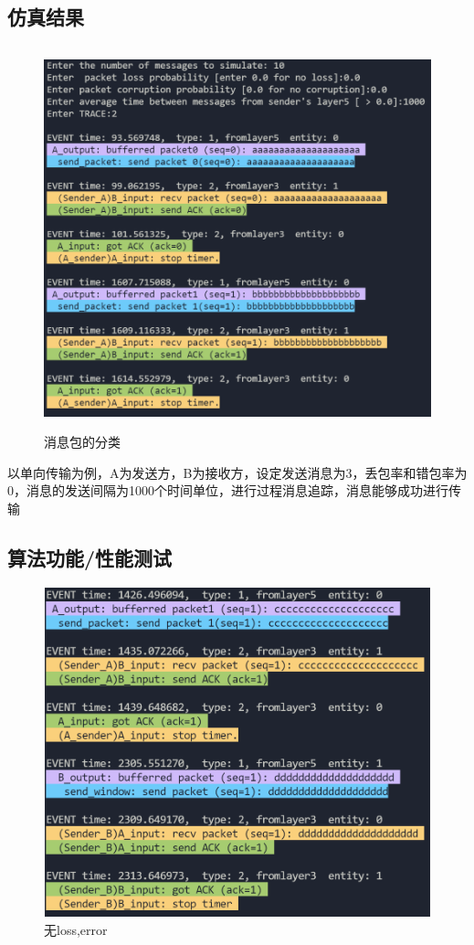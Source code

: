 \documentclass[UTF8,14pt]{article}
\numberwithin{figure}{section}
\begin{document}
\subsection{仿真结果}
\vspace{-0.7cm}
\begin{figure}[!htbp]
      \centering
      \setlength{\abovecaptionskip}{0.cm}
      \includegraphics[width=12cm,height=11.07cm]{gbn.png}
      \caption{消息包的分类}
\end{figure}
以单向传输为例，A为发送方，B为接收方，设定发送消息为3，丢包率和错包率为0，消息的发送间隔为1000个时间单位，进行过程消息追踪，消息能够成功进行传输
\vspace{-0.5cm}
\subsection{算法功能/性能测试}
\vspace{-0.5cm}
\begin{figure}[!htbp]
      \centering
      \setlength{\abovecaptionskip}{0.cm}
      \includegraphics[width=12cm,height=9.54cm]{gbn0_1.png}
      \caption{无loss,error}
\end{figure}
\end{document}
